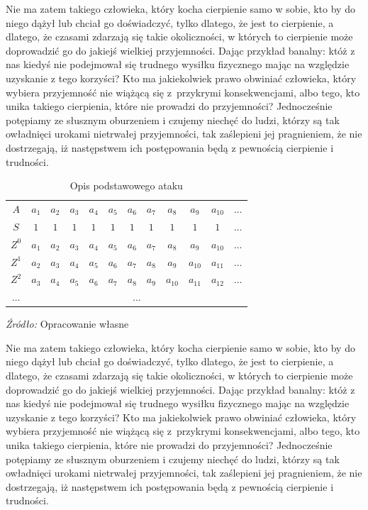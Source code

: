\documentclass[12pt]{mwbk}
\theoremstyle{plain}
\theoremstyle{definition}
\theoremstyle{remark}
\newcommand\zrodlotab[1]{{\par\vspace{2mm}\small\textit{Źródło: }#1 }}
\begin{document}
Nie ma zatem takiego człowieka, który kocha cierpienie samo w sobie, 
kto by do niego dążył lub chciał go doświadczyć, tylko dlatego, że
jest to cierpienie, a dlatego, że czasami zdarzają się takie 
okoliczności, w których to cierpienie może doprowadzić 
go do jakiejś wielkiej przyjemności. 
Dając przykład banalny: któż z nas kiedyś nie podejmował 
się trudnego wysiłku fizycznego mając na względzie 
uzyskanie z tego korzyści? 
Kto ma jakiekolwiek prawo obwiniać człowieka, 
który wybiera przyjemność nie wiążącą się z~przykrymi 
konsekwencjami, albo tego, kto unika takiego cierpienia, 
które nie prowadzi do przyjemności? 
Jednocześnie potępiamy ze słusznym oburzeniem i czujemy 
niechęć do ludzi, którzy są tak owładnięci urokami nietrwałej 
przyjemności, tak zaślepieni jej pragnieniem, 
że nie dostrzegają, iż następstwem ich 
postępowania będą z pewnością cierpienie i trudności.

\begin{table}
	\centering
	\caption{Opis podstawowego ataku}
	\label{shgen-attack1-basic-idea1}
	{\small
	\begin{tabular}{|c|ccccccccccc|}
\hline
$A$ & $a_{1}$ & $a_{2}$ & $a_{3}$ & $a_{4}$ & $a_{5}$ & $a_{6}$ & $a_{7}$ & $a_{8}$ & $a_{9}$ & $a_{10}$ & $\ldots$ \\
$S$ & $1$ & $1$ & $1$ & $1$ & $1$ & $1$ & $1$ & $1$ & $1$ & $1$ & $\ldots$ \\ \cline{2-12}
$Z^0$ & $a_{1}$ & $a_{2}$ & $a_{3}$ & $a_{4}$ & $a_{5}$ & $a_{6}$ & $a_{7}$ & $a_{8}$ & $a_{9}$ & $a_{10}$ & $\ldots$ \\
$Z^1$ & $a_{2}$ & $a_{3}$ & $a_{4}$ & $a_{5}$ & $a_{6}$ & $a_{7}$ & $a_{8}$ & $a_{9}$ & $a_{10}$ & $a_{11}$ & $\ldots$ \\
$Z^2$ & $a_{3}$ & $a_{4}$ & $a_{5}$ & $a_{6}$ & $a_{7}$ & $a_{8}$ & $a_{9}$ & $a_{10}$ & $a_{11}$ & $a_{12}$ & $\ldots$ \\
$\ldots$ & \multicolumn{11}{c|}{$\ldots$} \\
\hline
\end{tabular}
\zrodlotab{Opracowanie własne}
}
\end{table}




Nie ma zatem takiego człowieka, który kocha cierpienie samo w sobie, 
kto by do niego dążył lub chciał go doświadczyć, tylko dlatego, że
jest to cierpienie, a dlatego, że czasami zdarzają się takie 
okoliczności, w których to cierpienie może doprowadzić 
go do jakiejś wielkiej przyjemności. 
Dając przykład banalny: któż z nas kiedyś nie podejmował 
się trudnego wysiłku fizycznego mając na względzie 
uzyskanie z tego korzyści? 
Kto ma jakiekolwiek prawo obwiniać człowieka, 
który wybiera przyjemność nie wiążącą się z~przykrymi 
konsekwencjami, albo tego, kto unika takiego cierpienia, 
które nie prowadzi do przyjemności? 
Jednocześnie potępiamy ze słusznym oburzeniem i czujemy 
niechęć do ludzi, którzy są tak owładnięci urokami nietrwałej 
przyjemności, tak zaślepieni jej pragnieniem, 
że nie dostrzegają, iż następstwem ich 
postępowania będą z pewnością cierpienie i trudności.
\end{document}
